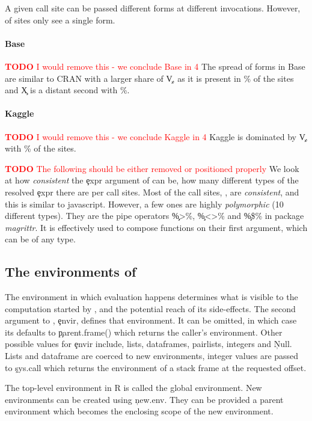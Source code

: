 \documentclass[screen,acmsmall]{acmart}
\newcommand{\authorcomment}[3]{\xspace\textcolor{#1}{{\bf #2} #3}\xspace}
\newcommand{\todo}[1]{\authorcomment{red}{TODO}{#1}}
\begin{document}
A given \eval call site can be passed different forms at different invocations.
However, \packageNbOneMinimizedPercent of sites only see a single form.

\paragraph{Base}
\todo{I would remove this - we conclude Base in 4}
The spread of forms in Base are similar to CRAN with a larger share of \c{V}, as
it is present in \baseMinimizedpropsitesa\% of the sites and \c{X} is a distant
second with \baseMinimizedpropsitesb\%.

\paragraph{Kaggle}
\todo{I would remove this - we conclude Kaggle in 4}
Kaggle is dominated by \c{V}, with \kaggleMinimizedpropsitesa\% of the
\kaggleNbCallSites sites.

\todo{The following should be either removed or positioned properly}
We look at how \emph{consistent} the \c{expr} argument of \eval can be, \ie how
many different types of the resolved \c{expr} there are per call sites. Most of
the call sites, \ie \PercentMonomorphic, are \emph{consistent}, and this is
similar to javascript. However, a few ones are highly \emph{polymorphic} (10
different types). They are the pipe operators \c{\%>\%}, \c{\%<>\%} and
\c{\%\$\%} in package \emph{magrittr}. It is effectively used to compose
functions on their first argument, which can be of any type.

\subsection{The environments of \eval}

The environment in which evaluation happens determines what is visible to the
computation started by \eval, and the potential reach of its side-effects. The
second argument to \eval, \c{envir}, defines that environment. It can be
omitted, in which case its defaults to \c{parent.frame()} which returns the
caller's environment. Other possible values for \c{envir} include, lists,
dataframes, pairlists, integers and \c{Null}. Lists and dataframe are coerced to
new environments, integer values are passed to \c{sys.call} which returns the
environment of a stack frame at the requested offset.



The top-level environment in R is called the global environment. New
environments can be created using \c{new.env}. They can be provided a parent
environment which becomes the enclosing scope of the new environment.
\end{document}
